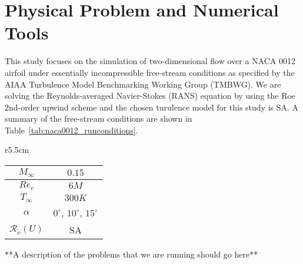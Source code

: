 
\section{Physical Problem and Numerical Tools}

This study focuses on the simulation of two-dimensional flow over a NACA 0012 airfoil under essentially incompressible free-stream conditions as specified by the AIAA Turbulence Model Benchmarking Working Group (TMBWG).  We are solving the Reynolds-averaged Navier-Stokes (RANS) equation by using the Roe 2nd-order upwind scheme and the chosen turulence model for this study is SA. A summary of the free-stream conditions are shown in Table~\ref{tab:naca0012_runconditions}. 

\begin{wraptable}{r}{5.5cm}
  \begin{center}
  \begin{tabular}{||c|c||} \hline
    $M_\infty$ & $0.15$ \\ \hline 
    $Re_c$     & $6M$ \\ \hline
    $T_\infty$ & $300K$ \\ \hline
    $\alpha$ & $0^{\circ}$, $10^{\circ}$, $15^{\circ}$ \\ \hline
    $\mathcal{R}_{\tilde\nu}(U)$ & SA \\ \hline
  \end{tabular}
  \caption{NACA 0012 free-stream conditions.} \label{tab:naca0012_runconditions}
  \end{center}
\end{wraptable} 

**A description of the problems that we are running should go here**





%






